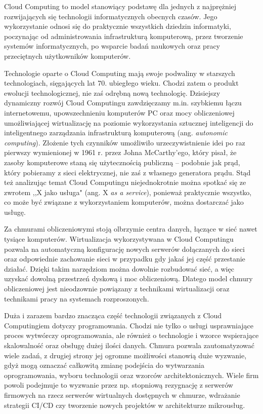 \documentclass[12pt,a4paper,twoside,titlepage,openright]{book}
\begin{document}
Cloud Computing to model stanowiący podstawę dla jednych z najprężniej rozwijających się technologii informatycznych obecnych czasów. Jego wykorzystanie odnosi się do praktycznie wszystkich dziedzin informatyki, poczynając od administrowania infrastrukturą komputerową, przez tworzenie systemów informatycznych, po wsparcie badań naukowych oraz pracy przeciętnych użytkowników komputerów. 

Technologie oparte o Cloud Computing mają swoje podwaliny w starszych technologiach, sięgających lat 70. ubiegłego wieku. Chodzi zatem o produkt ewolucji technologicznej, nie zaś odrębną nową technologię. Dzisiejszy dynamiczny rozwój Cloud Computingu zawdzięczamy m.in. szybkiemu łączu internetowemu, upowszechnieniu komputerów PC oraz mocy obliczeniowej umożliwiającej wirtualizację na poziomie wykorzystania sztucznej inteligencji do inteligentnego zarządzania infrastrukturą komputerową (ang. \textit{autonomic computing}). Złożenie tych czynników umożliwiło urzeczywistnienie idei po raz pierwszy wymienionej w 1961 r. przez Johna McCarthy'ego, który pisał, że zasoby komputerowe staną się użytecznością publiczną -- podobnie jak prąd, który pobieramy z sieci elektrycznej, nie zaś z własnego generatora prądu.\cite{ccCambridge,ccSpringer} Stąd też analizując temat Cloud Computingu niejednokrotnie można spotkać się ze zwrotem ,,X jako usługa" (ang. X \textit{as a service}), ponieważ praktycznie wszystko, co może być związane z wykorzystaniem komputerów, można dostarczać jako usługę. \cite{ccCambridge}

Za chmurami obliczeniowymi stoją olbrzymie centra danych, łączące w sieć nawet tysiące komputerów. Wirtualizacja wykorzystywana w Cloud Computingu pozwala na automatyczną konfigurację nowych serwerów dołączanych do sieci oraz odpowiednie zachowanie sieci w przypadku gdy jakaś jej część przestanie działać. Dzięki takim narzędziom można dowolnie rozbudować sieć, a więc uzyskać dowolną przestrzeń dyskową i moc obliczeniową. Dlatego model chmury obliczeniowej jest nieodzownie powiązany z technikami wirtualizacji oraz technikami pracy na systemach rozproszonych.

Duża i zarazem bardzo znacząca część technologii związanych z Cloud Computingiem dotyczy programowania. Chodzi nie tylko o usługi usprawniające proces wytwórczy oprogramowania, ale również o technologie i wzorce wspierające skalowalność oraz obsługę dużej ilości danych. Chmura pozwala zautomatyzować wiele zadań, z drugiej strony jej ogromne możliwości stanowią duże wyzwanie, gdyż mogą oznaczać całkowitą zmianę podejścia do wytwarzania oprogramowania, wyboru technologii oraz wzorców architektonicznych. Wiele firm powoli podejmuje to wyzwanie przez np. stopniową rezygnację z serwerów firmowych na rzecz serwerów wirtualnych dostępnych w chmurze, wdrażanie strategii CI/CD czy tworzenie nowych projektów w architekturze mikrousług. 
\end{document}

